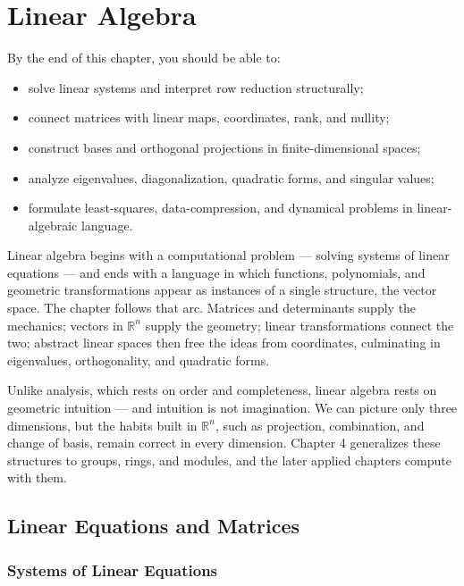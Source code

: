\chapter{Linear Algebra}

\begin{learningobjectives}
By the end of this chapter, you should be able to:
\begin{itemize}
    \item solve linear systems and interpret row reduction structurally;
    \item connect matrices with linear maps, coordinates, rank, and nullity;
    \item construct bases and orthogonal projections in finite-dimensional spaces;
    \item analyze eigenvalues, diagonalization, quadratic forms, and singular values;
    \item formulate least-squares, data-compression, and dynamical problems in linear-algebraic language.
\end{itemize}
\end{learningobjectives}
Linear algebra begins with a computational problem — solving systems of linear equations — and ends with a language in which functions, polynomials, and geometric transformations appear as instances of a single structure, the vector space. The chapter follows that arc. Matrices and determinants supply the mechanics; vectors in $\mathbb{R}^n$ supply the geometry; linear transformations connect the two; abstract linear spaces then free the ideas from coordinates, culminating in eigenvalues, orthogonality, and quadratic forms.

Unlike analysis, which rests on order and completeness, linear algebra rests on geometric intuition — and intuition is not imagination. We can picture only three dimensions, but the habits built in $\mathbb{R}^n$, such as projection, combination, and change of basis, remain correct in every dimension. Chapter 4 generalizes these structures to groups, rings, and modules, and the later applied chapters compute with them.

\section{Linear Equations and Matrices}

\subsection{Systems of Linear Equations}

